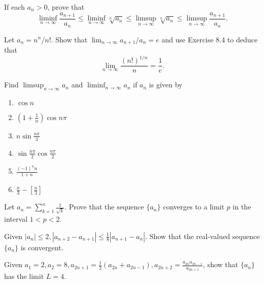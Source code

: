     \begin{problembox}
    If each \(a_n > 0\), prove that
    \[\liminf_{n \to \infty} \frac{a_{n+1}}{a_n} \leq \liminf_{n \to \infty} \sqrt[n]{a_n} \leq \limsup_{n \to \infty} \sqrt[n]{a_n} \leq \limsup_{n \to \infty} \frac{a_{n+1}}{a_n}.\]
    \end{problembox}
    
    \begin{problembox}
    Let \(a_n = n^n / n!\). Show that \(\lim_{n \to \infty} a_{n+1} / a_n = e\) and use Exercise 8.4 to deduce that
    \[\lim_{n \to \infty} \frac{(n!)^{1/n}}{n} = \frac{1}{e}.\]
    \end{problembox}
    
    \begin{problembox}
    Find \(\limsup_{n \to \infty} a_n\) and \(\liminf_{n \to \infty} a_n\) if \(a_n\) is given by
    \begin{enumerate}[label=(\alph*)]
    \item \(\cos n\)
    \item \(\left(1 + \frac{1}{n}\right) \cos n\pi\)
    \item \(n \sin \frac{n\pi}{3}\)
    \item \(\sin \frac{n\pi}{2} \cos \frac{n\pi}{2}\)
    \item \(\frac{(-1)^n n}{1 + n}\)
    \item \(\frac{n}{3} - \left[\frac{n}{3}\right]\)
    \end{enumerate}
    \end{problembox}
    
    \begin{problembox}
    Let \(a_n = \sum_{k=1}^n \frac{1}{\sqrt{k}}\). Prove that the sequence \(\{a_n\}\) converges to a limit \(p\) in the interval \(1 < p < 2\).
    \end{problembox}
    
    \begin{problembox}
    Given \(|a_n| \leq 2, |a_{n+2} - a_{n+1}| \leq \frac{1}{8} |a_{n+1} - a_n|\). Show that the real-valued sequence \(\{a_n\}\) is convergent.
    \end{problembox}
    
    \begin{problembox}
    Given \(a_1 = 2, a_2 = 8, a_{2n+1} = \frac{1}{2}(a_{2n} + a_{2n-1}), a_{2n+2} = \frac{a_{2n} a_{2n-1}}{a_{2n+1}}\), show that \(\{a_n\}\) has the limit \(L = 4\).
    \end{problembox}
    
